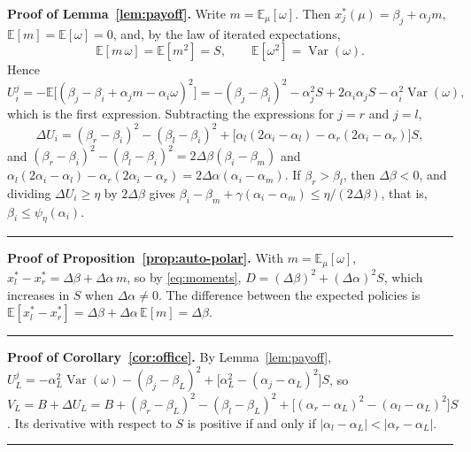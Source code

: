 \documentclass[12pt,letterpaper]{article}
\newenvironment{proof}[1][Proof]{\noindent\textbf{#1.} }{\ \rule{0.5em}{0.5em}}
\begin{document}
\begin{proof}[Proof of Lemma~\ref{lem:payoff}]
Write $m=\mathbb{E}_\mu[\omega]$. Then $x^*_j(\mu)=\beta_j+\alpha_j m$, $\mathbb{E}[m]=\mathbb{E}[\omega]=0$, and, by the law of iterated expectations,
\begin{equation}\label{eq:moments}
\mathbb{E}[m\,\omega]=\mathbb{E}[m^2]=S,\qquad \mathbb{E}[\omega^2]=\operatorname{Var}(\omega).
\end{equation}
Hence
\[
U_i^j=-\mathbb{E}\big[(\beta_j-\beta_i+\alpha_j m-\alpha_i\omega)^2\big]
=-(\beta_j-\beta_i)^2-\alpha_j^2S+2\alpha_i\alpha_jS-\alpha_i^2\operatorname{Var}(\omega),
\]
which is the first expression. Subtracting the expressions for $j=r$ and $j=l$,
\[
\Delta U_i=(\beta_r-\beta_i)^2-(\beta_l-\beta_i)^2+\big[\alpha_l(2\alpha_i-\alpha_l)-\alpha_r(2\alpha_i-\alpha_r)\big]S ,
\]
and $(\beta_r-\beta_i)^2-(\beta_l-\beta_i)^2=2\Delta\beta(\beta_i-\beta_m)$ and $\alpha_l(2\alpha_i-\alpha_l)-\alpha_r(2\alpha_i-\alpha_r)=2\Delta\alpha(\alpha_i-\alpha_m)$. If $\beta_r>\beta_l$, then $\Delta\beta<0$, and dividing $\Delta U_i\ge\eta$ by $2\Delta\beta$ gives $\beta_i-\beta_m+\gamma(\alpha_i-\alpha_m)\le\eta/(2\Delta\beta)$, that is, $\beta_i\le\psi_\eta(\alpha_i)$.
\end{proof}

\begin{proof}[Proof of Proposition~\ref{prop:auto-polar}]
With $m=\mathbb{E}_\mu[\omega]$, $x^*_l-x^*_r=\Delta\beta+\Delta\alpha\,m$, so by \eqref{eq:moments}, $D=(\Delta\beta)^2+(\Delta\alpha)^2S$, which increases in $S$ when $\Delta\alpha\ne0$. The difference between the expected policies is $\mathbb{E}[x^*_l-x^*_r]=\Delta\beta+\Delta\alpha\,\mathbb{E}[m]=\Delta\beta$.
\end{proof}

\begin{proof}[Proof of Corollary~\ref{cor:office}]
By Lemma~\ref{lem:payoff}, $U_L^j=-\alpha_L^2\operatorname{Var}(\omega)-(\beta_j-\beta_L)^2+\big[\alpha_L^2-(\alpha_j-\alpha_L)^2\big]S$, so $V_L=B+\Delta U_L=B+(\beta_r-\beta_L)^2-(\beta_l-\beta_L)^2+\big[(\alpha_r-\alpha_L)^2-(\alpha_l-\alpha_L)^2\big]S$. Its derivative with respect to $S$ is positive if and only if $|\alpha_l-\alpha_L|<|\alpha_r-\alpha_L|$.
\end{proof}
\end{document}
